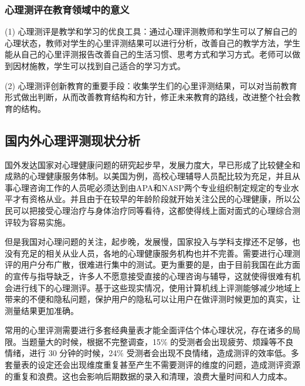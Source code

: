 \subsubsection{心理测评在教育领域中的意义}

(1) 心理测评是教学和学习的优良工具：通过心理评测教师和学生可以了解自己的心理状态，教师对学生的心里评测结果可以进行分析，改善自己的教学方法，学生能从自己的心里评测报告改善自己的生活习惯、思考方式和学习方式。老师可以做到因材施教，学生可以找到自己适合的学习方式。

(2) 心理测评创新教育的重要手段：收集学生们的心里评测结果，可以对当前教育形式做出判断，从而改善教育结构和方针，修正未来教育的路线，改进整个社会教育的结构。

\subsection{国内外心理评测现状分析}

国外发达国家对心理健康问题的研究起步早，发展力度大，早已形成了比较健全和成熟的心理健康服务体制。以美国为例，高校心理辅导人员配比较为充足，并且从事心理咨询工作的人员呢必须达到由APA和NASP两个专业组织制定规定的专业水平才有资格从业。并且由于在较早的年龄阶段就开始关注公民的心理健康，所以公民可以把接受心理治疗与身体治疗同等看待，这都使得线上面对面式的心理综合测评较为容易实施。

但是我国对心理问题的关注，起步晚，发展慢，国家投入与学科支撑还不足够，也没有充足的相关从业人员，各地的心理健康服务机构也并不完善。需要进行心理测评的用户分布广散，很难进行集中的测试。更为重要的是，由于目前我国在此方面的宣传与指导缺乏，许多人不愿意接受直接的心理咨询与辅导，这就使得很难有机会进行线下的心理测评。基于这些现实情况，使用计算机线上评测能够减少地域上带来的不便和隐私问题，保护用户的隐私可以让用户在做评测时候更加的真实，让测量结果更加准确。

常用的心里评测需要进行多套经典量表才能全面评估个体心理状况，存在诸多的局限。当题量大的时候，根据不完整调查，15\% 的受测者会出现疲劳、烦躁等不良情绪，进行 30 分钟的时候，24\% 受测者会出现不良情绪，造成测评的效率低。多套量表的设定还会出现维度重复甚至产生不需要测评的维度的问题，造成测评资源的重复和浪费。这也会影响后期数据的录入和清理，浪费大量时间和人力成本。